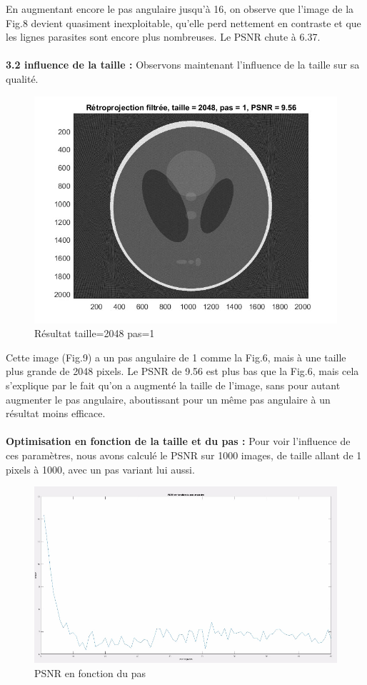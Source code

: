 \documentclass[conference]{IEEEtran}
\begin{document}
En augmentant encore le pas angulaire jusqu'à 16, on observe que l'image de la Fig.8 devient quasiment inexploitable, qu'elle perd nettement en contraste et que les lignes parasites sont encore plus nombreuses. Le PSNR chute à 6.37.
\\
\\
\textbf{3.2 influence de la taille : }
Observons maintenant l'influence de la taille sur sa qualité.

\begin{figure}[H]
\centering
\includegraphics[scale=0.5]{t2048-p1}
	\caption[Résultat taille=2048 pas=1]{Résultat taille=2048 pas=1}
\label{fig:gallery}
\end{figure}

Cette image (Fig.9) a un pas angulaire de 1 comme la Fig.6, mais à une taille plus grande de 2048 pixels. Le PSNR de 9.56 est plus bas que la Fig.6, mais cela s'explique par le fait qu'on a augmenté la taille de l'image, sans pour autant augmenter le pas angulaire, aboutissant pour un même pas angulaire à un résultat moins efficace.
\\
\\
\textbf{Optimisation en fonction de la taille et du pas : }
Pour voir l'influence de ces paramètres, nous avons calculé le PSNR sur 1000 images, de taille allant de 1 pixels à 1000, avec un pas variant lui aussi.

\begin{figure}[H]
\centering
\includegraphics[scale=0.35]{PSNR2}
	\caption[PSNR en fonction du pas]{PSNR en fonction du pas}
\label{fig:gallery}
\end{figure}
\end{document}
